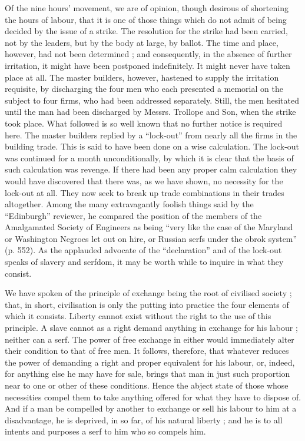 Of the nine hours' movement, we are of opinion, though
desirous of shortening the hours of labour, that it is one of those
things which do not admit of being decided by the issue of a strike. The
resolution for the strike had been carried, not by the leaders, but by
the body at large, by ballot. The time and place, however, had not been
determined ; and consequently, in the absence of further irritation, it
might have been postponed indefinitely. It might never have taken place
at all. The master builders, however, hastened to supply the irritation
requisite, by discharging the four men who each presented a memorial on
the subject to four firms, who had been addressed separately. Still, the
men hesitated until the man had been discharged by Messrs. Trollope and
Son, when the strike took place. What followed is so well known that no
further notice is required here. The master builders replied by a
``lock-out'' from nearly all the firms in the building trade. This is
said to have been done on a wise calculation. The lock-out was continued
for a month unconditionally, by which it is clear that the basis of such
calculation was revenge. If there had been any proper calm calculation
they would have discovered that there was, as we have shown, no
necessity for the lock-out at all. They now seek to break up trade
combinations in their trades altogether. Among the many extravagantly
foolish things said by the ``Edinburgh'' reviewer, he compared the
position of the members of the Amalgamated Society of Engineers as being
``very like the case of the Maryland or Washington Negroes let out on
hire, or Russian serfs under the obrok system'' (p. 552). As the
applauded advocate of the ``declaration'' and of the lock-out speaks of
slavery and serfdom, it may be worth while to inquire in what they
consist.

We have spoken of the principle of exchange being the root of civilised
society ; that, in short, civilisation is only the putting into practice
the four elements of which it consists. Liberty cannot exist without the
right to the use of this principle. A slave cannot as a right demand
anything in exchange for his labour ; neither can a serf. The power of
free exchange in either would immediately alter their condition to that
of free men. It follows, therefore, that whatever reduces the power of
demanding a right and proper equivalent for his labour, or, indeed, for
anything else he may have for sale, brings that man in just such
proportion near to one or other of these conditions. Hence the abject
state of those whose necessities compel them to take anything offered for
what they have to dispose of. And if a man be compelled by another to
exchange or sell his labour to him at a disadvantage, he is deprived, in
so far, of his natural liberty ; and he is to all intents and purposes a
serf to him who so compels him.

